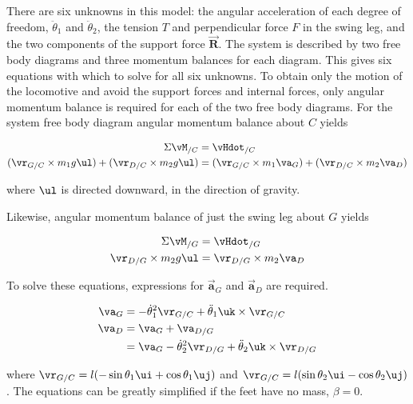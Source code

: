 There are six unknowns in this model: the angular acceleration of each degree of freedom, $\ddot{\theta}_{1}$ and $\ddot{\theta}_{2}$, the tension $T$ and perpendicular force $F$ in the swing leg, and the two components of the support force $\vec{\mathbf{R}}$. The system is described by two free body diagrams and three momentum balances for each diagram. This gives six equations with which to solve for all six unknowns. To obtain only the motion of the locomotive and avoid the support forces and internal forces, only angular momentum balance is required for each of the two free body diagrams. For the system free body diagram angular momentum balance about $C$ yields

\begin{align}
\Sigma \vM_{/C} &= \vHdot_{/C} \notag \\
(\vr_{G/C} \times m_{1} g  \ul ) + (\vr_{D/C} \times m_{2} g  \ul ) &= (\vr_{G/C} \times m_{1} \va_{G}) + (\vr_{D/C} \times m_{2} \va_{D})
\label{eq:SimplestWalkerAMB1}
\end{align}

where $ \ul $ is directed downward, in the direction of gravity.

Likewise, angular momentum balance of just the swing leg about $G$ yields

\begin{align}
\Sigma \vM_{/G} &= \vHdot_{/G} \notag \\
\vr_{D/G} \times m_{2} g  \ul  &= \vr_{D/G} \times m_{2} \va_{D}
\label{eq:SimplestWalkerAMB2}
\end{align}

To solve these equations, expressions for $\vec{\mathbf{a}}_{G}$ and $\vec{\mathbf{a}}_{D}$ are required.

\begin{align}
\va_{G} &= -\dot{\theta}_{1}^{2} \vr_{G/C} + \ddot{\theta}_{1} \uk \times \vr_{G/C} \\
\va_{D}  &= \va_{G} + \va_{D/G} \notag \\
 &= \va_{G}  -\dot{\theta}_{2}^{2} \vr_{D/G} + \ddot{\theta}_{2} \uk \times \vr_{D/G}
\end{align}

where $\vr_{G/C} = l (- \sin{\theta_{1}} \ui +\cos{\theta_{1}} \uj)$ and $\vr_{G/C} = l (\sin{\theta_{2}} \ui - \cos{\theta_{2}} \uj)$. The equations can be greatly simplified if the feet have no mass, $\beta = 0$.


